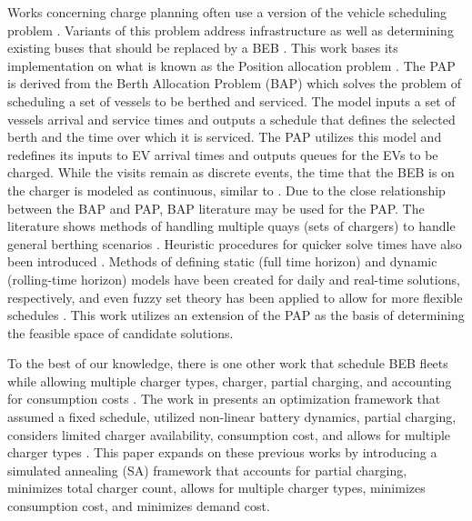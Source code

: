 \documentclass[ee,thesis]{usuthesis}
\begin{document}
Works concerning charge planning often use a version of the vehicle scheduling problem \cite{tang-2019-robus-sched,li-2014-trans-bus,he-2020-optim-charg}. Variants of this problem address infrastructure as well as determining
existing buses that should be replaced by a BEB \cite{zhou-2020-bi-objec,duan-2021-refor-mixed,rinaldi-2020-mixed-fleet,zhou-2020-collab-optim}. This work bases its implementation on what is known as the Position
allocation problem \cite{qarebagh-2019-optim-sched}. The PAP is derived from the Berth Allocation Problem (BAP) which
solves the problem of scheduling a set of vessels to be berthed and serviced. The model inputs a set of vessels arrival
and service times and outputs a schedule that defines the selected berth and the time over which it is serviced. The PAP
utilizes this model and redefines its inputs to EV arrival times and outputs queues for the EVs to be charged. While the
visits remain as discrete events, the time that the BEB is on the charger is modeled as continuous, similar to
\cite{frojan-2015-contin-berth,qarebagh-2019-optim-sched,zhou-2020-collab-optim}. Due to the close relationship
between the BAP and PAP, BAP literature may be used for the PAP. The literature shows methods of handling multiple quays
(sets of chargers) to handle general berthing scenarios \cite{frojan-2015-contin-berth,dai-2008-suppl-chain-analy}.
Heuristic procedures for quicker solve times have also been introduced \cite{imai-2001-dynam-berth}. Methods of
defining static (full time horizon) and dynamic (rolling-time horizon) models have been created for daily and real-time
solutions, respectively, and even fuzzy set theory has been applied to allow for more flexible schedules
\cite{bello-2019-fuzzy-activ,dai-2008-suppl-chain-analy,buhrkal-2011-model-discr,frojan-2015-contin-berth}. This
work utilizes an extension of the PAP as the basis of determining the feasible space of candidate solutions.

To the best of our knowledge, there is one other work that schedule BEB fleets while allowing multiple charger types,
charger, partial charging, and accounting for consumption costs \cite{whitaker-2023-a-network}. The work in
\cite{whitaker-2023-a-network} presents an optimization framework that assumed a fixed schedule, utilized non-linear
battery dynamics, partial charging, considers limited charger availability, consumption cost, and allows for multiple
charger types \cite{whitaker-2023-a-network}. This paper expands on these previous works by introducing a simulated
annealing (SA) framework that accounts for partial charging, minimizes total charger count, allows for multiple charger
types, minimizes consumption cost, and minimizes demand cost.
\end{document}
